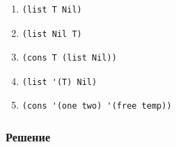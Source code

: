 \documentclass[a4paper,oneside,14pt]{extarticle}
\begin{document}
\begin{enumerate}
    \item \begin{lstlisting}[label={lst:}]
(list T Nil)
        \end{lstlisting}

    \item \begin{lstlisting}[label={lst:}]
(list Nil T)
        \end{lstlisting}

    \item \begin{lstlisting}[label={lst:}]
(cons T (list Nil))
        \end{lstlisting}

    \item \begin{lstlisting}[label={lst:}]
(list '(T) Nil)
        \end{lstlisting}

    \item \begin{lstlisting}[label={lst:}]
(cons '(one two) '(free temp))
        \end{lstlisting}
\end{enumerate}

\subsubsection*{Решение}
\end{document}
